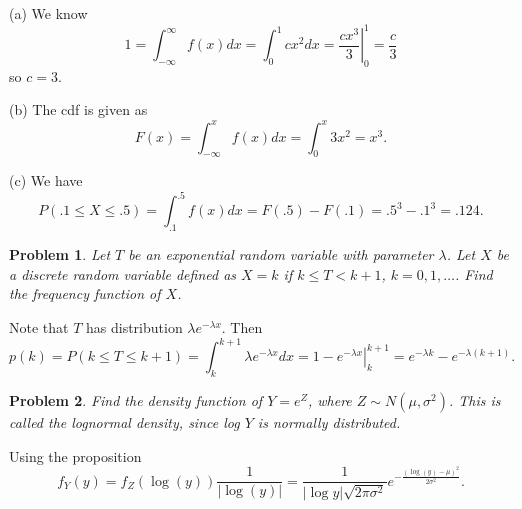 \documentclass{article}
\newtheorem{problem}{Problem}
\begin{document}
(a) We know
\[
1 = \int_{-\infty}^{\infty} f(x) dx = \int_0^1 cx^2 dx = \left. \frac{cx^3}{3} \right |_0^1 = \frac{c}{3}
\]
so $c = 3$.

(b) The cdf is given as
\[
F(x) = \int_{-\infty}^{x} f(x) dx = \int_0^x 3x^2 = x^3.
\]

(c) We have
\[
P(.1 \leq X \leq .5) = \int_{.1}^{.5} f(x) dx = F(.5) - F(.1) = .5^3 - .1^3 = .124.
\]

\begin{problem}
Let $T$ be an exponential random variable with parameter $\lambda$. Let $X$ be a discrete random variable defined as $X = k$ if $k \leq T < k+1$, $k = 0, 1, \dots$. Find the frequency function of $X$.
\end{problem}

Note that $T$ has distribution $\lambda e^{-\lambda x}$. Then
\[
p(k) = P(k \leq T \leq k+1) = \int_{k}^{k+1} \lambda e^{-\lambda x} dx = \left. 1 - e^{-\lambda x} \right |_{k}^{k+1} = e^{-\lambda k} - e^{-\lambda (k+1)}.
\]

\begin{problem}
Find the density function of $Y = e^Z$, where $Z \sim N (\mu, \sigma^2)$. This is called the \emph{lognormal density}, since log $Y$ is normally distributed.
\end{problem}

Using the proposition
\[
f_Y(y) = f_Z(\log (y)) \frac{1}{|\log(y)|} = \frac{1}{|\log y| \sqrt{2 \pi \sigma^2}}e^{-\frac{(\log(y) - \mu)^2}{2\sigma^2}}.
\]
\end{document}

